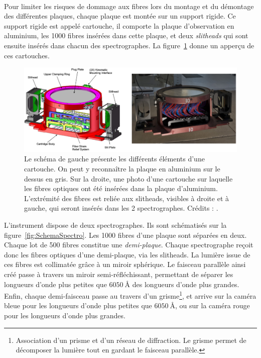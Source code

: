\paragraph{} Pour limiter les risques de dommage aux fibres lors du montage et du démontage des différentes plaques, chaque plaque est montée sur un support rigide. Ce support rigide est appelé cartouche, il comporte la plaque d'observation en aluminium, les \num{1000} fibres insérées dans cette plaque, et deux \emph{slitheads} qui sont ensuite insérés dans chacun des spectrographes. La figure~\ref{fig:CartoucheImage} donne un apperçu de ces cartouches.\\
\begin{figure}
  \centering
  \includegraphics[scale=0.35]{CartoucheImage}
  \caption{Le schéma de gauche présente les différents éléments d'une cartouche. On peut y reconnaître la plaque en aluminium sur le dessus en gris. Sur la droite, une photo d'une cartouche sur laquelle les fibres optiques ont été insérées dans la plaque d'aluminium. L'extrémité des fibres est reliée aux slitheads, visibles à droite et à gauche, qui seront insérés dans les 2 spectrographes. Crédits : \textcite{Smee2012}.}
  \label{fig:CartoucheImage}
\end{figure}
L'instrument dispose de deux spectrographes. Ils sont schématisés sur la figure~\ref{fig:SchemaSpectro}.
Les \num{1000} fibres d'une plaque sont séparées en deux. Chaque lot de \num{500} fibres constitue une \emph{demi-plaque}. Chaque spectrographe reçoit donc les fibres optiques d'une demi-plaque, via les slitheads.
La lumière issue de ces fibres est collimatée grâce à un miroir sphérique. Le faisceau parallèle ainsi créé passe à travers un miroir semi-réfléchissant, permettant de séparer les longueurs d'onde plus petites que $\SI{6050}{\angstrom}$ des longueurs d'onde plus grandes. Enfin, chaque demi-faisceau passe au travers d'un grisme\footnote{Association d'un prisme et d'un réseau de diffraction. Le grisme permet de décomposer la lumière tout en gardant le faisceau parallèle.}, et arrive sur la caméra bleue pour les longueurs d'onde plus petites que $\SI{6050}{\angstrom}$, ou sur la caméra rouge pour les longueurs d'onde plus grandes. 
